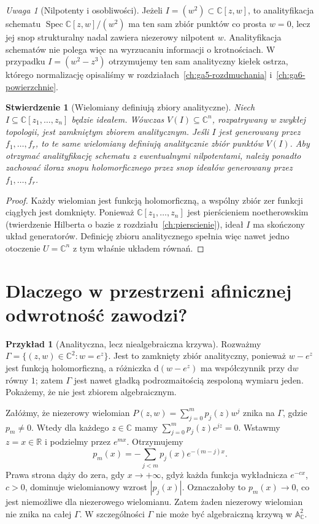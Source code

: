 \documentclass[11pt,a4paper,openany]{report}
\numberwithin{equation}{section}
\theoremstyle{plain}
\newtheorem{stwierdzenie}[twierdzenie]{Stwierdzenie}
\theoremstyle{definition}
\newtheorem{przyklad}[twierdzenie]{Przykład}
\theoremstyle{remark}
\newtheorem{uwaga}[twierdzenie]{Uwaga}
\newcommand{\R}{\mathbb R}
\newcommand{\C}{\mathbb C}
\newcommand{\A}{\mathbb A}
\begin{document}
\begin{uwaga}[Nilpotenty i osobliwości]
Jeżeli $I=(w^2)\subset\C[z,w]$, to analityfikacja schematu
$\operatorname{Spec}\C[z,w]/(w^2)$ ma ten sam zbiór punktów co prosta
$w=0$, lecz jej snop strukturalny nadal zawiera niezerowy nilpotent
$w$. Analityfikacja schematów nie polega więc na wyrzucaniu informacji
o krotnościach. W przypadku $I=(w^2-z^3)$ otrzymujemy ten sam
analityczny kiełek ostrza, którego normalizację opisaliśmy w
rozdziałach~\ref{ch:ga5-rozdmuchania} i~\ref{ch:ga6-powierzchnie}.
\end{uwaga}

\begin{stwierdzenie}[Wielomiany definiują zbiory analityczne]
Niech $I\subseteq\C[z_1,\ldots,z_n]$ będzie ideałem. Wówczas
$V(I)\subseteq\C^n$, rozpatrywany w zwykłej topologii, jest
zamkniętym zbiorem analitycznym. Jeśli $I$ jest generowany przez $f_1,\ldots,f_r$, to te same
wielomiany definiują analitycznie \emph{zbiór punktów} $V(I)$.
Aby otrzymać analityfikację schematu z ewentualnymi nilpotentami,
należy ponadto zachować iloraz snopu holomorficznego przez snop
ideałów generowany przez $f_1,\ldots,f_r$.
\end{stwierdzenie}
\begin{proof}
Każdy wielomian jest funkcją holomorficzną, a wspólny zbiór zer
funkcji ciągłych jest domknięty. Ponieważ $\C[z_1,\ldots,z_n]$ jest
pierścieniem noetherowskim (twierdzenie Hilberta o bazie z
rozdziału~\ref{ch:pierscienie}), ideał $I$ ma skończony układ
generatorów. Definicję zbioru analitycznego spełnia więc nawet
jedno otoczenie $U=\C^n$ z tym właśnie układem równań.
\end{proof}

\section{Dlaczego w przestrzeni afinicznej odwrotność zawodzi?}
\label{sec:ga9-wykladnicza}

\begin{przyklad}[Analityczna, lecz niealgebraiczna krzywa]
\label{prz:ga9-exp}
Rozważmy $\Gamma=\{(z,w)\in\C^2:w=e^z\}$.
Jest to zamknięty zbiór analityczny, ponieważ $w-e^z$ jest
funkcją holomorficzną, a różniczka $\mathrm d(w-e^z)$ ma współczynnik
przy $\mathrm dw$ równy $1$; zatem $\Gamma$ jest nawet gładką
podrozmaitością zespoloną wymiaru jeden. Pokażemy, że nie jest
zbiorem algebraicznym.

Załóżmy, że niezerowy wielomian $P(z,w)=\sum_{j=0}^m p_j(z)w^j$
znika na $\Gamma$, gdzie $p_m\ne0$. Wtedy dla każdego $z\in\C$
mamy $\sum_{j=0}^m p_j(z)e^{jz}=0$. Wstawmy $z=x\in\R$
i podzielmy przez $e^{mx}$. Otrzymujemy
\[
 p_m(x)=-\sum_{j<m}p_j(x)e^{-(m-j)x}.
\]
Prawa strona dąży do zera, gdy $x\to+\infty$, gdyż każda
funkcja wykładnicza $e^{-cx}$, $c>0$, dominuje wielomianowy
wzrost $|p_j(x)|$. Oznaczałoby to $p_m(x)\to0$, co jest niemożliwe
dla niezerowego wielomianu. Zatem żaden niezerowy wielomian
nie znika na całej $\Gamma$. W szczególności $\Gamma$ nie może
być algebraiczną krzywą w $\A^2_\C$.
\end{przyklad}
\end{document}
